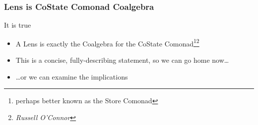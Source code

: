 \begin{frame}
\frametitle{Lens is CoState Comonad Coalgebra}

\begin{block}{It is true}
  \begin{itemize}
  \item A Lens is exactly the Coalgebra for the CoState Comonad\footnote{perhaps better known as the Store Comonad}\footnote{\emph{Russell O'Connor}}
  \item This is a concise, fully-describing statement, so we can go home now\ldots
  \item \ldots or we can examine the implications
  \end{itemize}
\end{block}
\end{frame}

